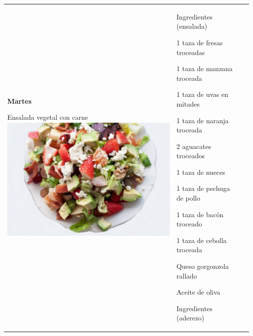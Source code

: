 \documentclass[menu.tex]{subfiles}
\begin{document}
\begin{tabular} {p{3.5cm} p{4cm} p{9cm}}
    \pbox{20cm}
    {
        \rule{0pt}{3ex}\begin{large}\textbf{Martes}\end{large}\\ 
        \rule{0pt}{2ex}Ensalada vegetal con carne\\
        \includegraphics[scale=0.33]{ensalada-vegetal-con-carne} 
    } & 
    \vspace{-1.75cm}            
    \hspace{0.5cm}\begin{footnotesize}Ingredientes (ensalada)\end{footnotesize}
    \begin{compactitem} 
        \begin{scriptsize}
            \item 1 taza de fresas troceadas
            \item 1 taza de manzana troceada
            \item 1 taza de uvas en mitades
            \item 1 taza de naranja troceada
            \item 2 aguacates troceados
            \item 1 taza de nueces
            \item 1 taza de pechuga de pollo
            \item 1 taza de bacón troceado
            \item 1 taza de cebolla troceada
            \item Queso gorgonzola rallado
            \item Aceite de oliva               
        \end{scriptsize}
    \end{compactitem}
    \hspace{0.5cm}\begin{footnotesize}Ingredientes (aderezo)\end{footnotesize}

\end{tabular}
\end{document}
